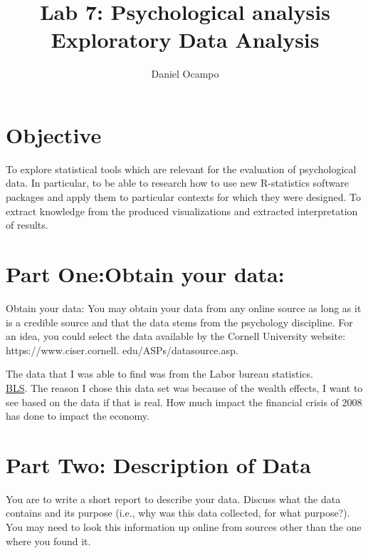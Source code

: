 \documentclass[11pt]{article}
\begin{document}
%
\author{Daniel Ocampo}
\title{Lab 7: Psychological analysis  Exploratory Data Analysis}
\maketitle

\section{Objective}
To explore statistical tools which are relevant for the evaluation of psychological data. In particular,
to be able to research how to use new R-statistics software packages and apply them to particular
contexts for which they were designed. To extract knowledge from the produced visualizations and
extracted interpretation of results.


\section{Part One:Obtain your data:}

Obtain your data: You may obtain your data from any online source as long as it is a
credible source and that the data stems from the psychology discipline. For an idea, you could
select the data available by the Cornell University website: https://www.ciser.cornell.
edu/ASPs/datasource.asp.


The data that I was able to find was from the Labor bureau statistics.\\
\href{https://www.bls.gov/cex/csxstnd.htm#2010}{BLS}. The reason I chose this data set was because of the wealth effects, I want to see based on the data if that is real. How much impact the financial crisis of 2008 has done to impact  the economy. 





\section{Part Two: Description of Data}

You are to write a short report to describe your data. Discuss what
the data contains and its purpose (i.e., why was this data collected, for what purpose?). You
may need to look this information up online from sources other than the one where you found
it.
\end{document}
